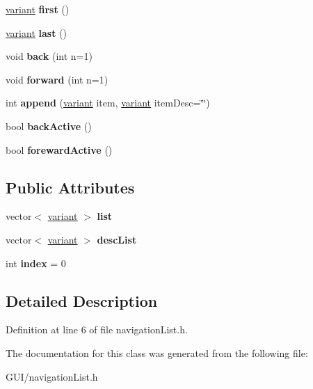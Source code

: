 \begin{DoxyCompactItemize}
\hyperlink{classvariant}{variant} {\bfseries first} ()
\item 
\mbox{\label{classnavigation_list_affcbdeaf3fd1c21d54da9d8dc74d2f4c}} 
\hyperlink{classvariant}{variant} {\bfseries last} ()
\item 
\mbox{\label{classnavigation_list_a9dff8eedc7b9df958295750754649e12}} 
void {\bfseries back} (int n=1)
\item 
\mbox{\label{classnavigation_list_a60d8f92416203e9ea2ecdf0495bf3952}} 
void {\bfseries forward} (int n=1)
\item 
\mbox{\label{classnavigation_list_a47ea449989e6e3f6c9d9b36bb4f4f5cc}} 
int {\bfseries append} (\hyperlink{classvariant}{variant} item, \hyperlink{classvariant}{variant} item\+Desc=\char`\"{}\char`\"{})
\item 
\mbox{\label{classnavigation_list_a63759afd35c04ebea77f2ecd34c568fd}} 
bool {\bfseries back\+Active} ()
\item 
\mbox{\label{classnavigation_list_aa94b99e0f0a4cc32090ec71731ca30f5}} 
bool {\bfseries foreward\+Active} ()
\end{DoxyCompactItemize}
\subsection*{Public Attributes}
\begin{DoxyCompactItemize}
\item 
\mbox{\label{classnavigation_list_afb46105ac028717ec19447dbe8c35fb9}} 
vector$<$ \hyperlink{classvariant}{variant} $>$ {\bfseries list}
\item 
\mbox{\label{classnavigation_list_a3bc6f829df7ee26508e1d01f99380618}} 
vector$<$ \hyperlink{classvariant}{variant} $>$ {\bfseries desc\+List}
\item 
\mbox{\label{classnavigation_list_acbef07d0b2b882e8d73572a2661db242}} 
int {\bfseries index} = 0
\end{DoxyCompactItemize}


\subsection{Detailed Description}


Definition at line 6 of file navigation\+List.\+h.



The documentation for this class was generated from the following file\+:\begin{DoxyCompactItemize}
\item 
G\+U\+I/navigation\+List.\+h\end{DoxyCompactItemize}
